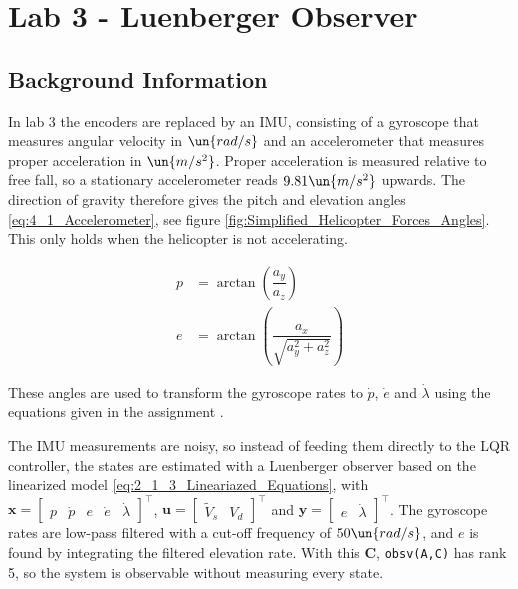 \section{Lab 3 - Luenberger Observer}

\subsection{Background Information}

In lab 3 the encoders are replaced by an IMU, consisting of a gyroscope that measures angular velocity in \(\un{rad/s}\) and an accelerometer that measures proper acceleration in \(\un{m/s^{2}}\).
Proper acceleration is measured relative to free fall, so a stationary accelerometer reads \(9.81\un{m/s^2}\) upwards.
The direction of gravity therefore gives the pitch and elevation angles \eqref{eq:4_1_Accelerometer}, see figure \ref{fig:Simplified_Helicopter_Forces_Angles}.
This only holds when the helicopter is not accelerating.

\begin{subequations}
    \begin{align}
        p & =\arctan\left( \dfrac{a_{y}}{a_{z}} \right) \label{eq:4_1_Pitch_From_Accelerometer} \\
        e & =\arctan\left( \dfrac{a_{x}}{\sqrt{ a_{y}^{2}+a_{z}^{2} }} \right) \label{eq:4_1_Elecvation_From_Accelerometer}
    \end{align} \label{eq:4_1_Accelerometer}
\end{subequations}

These angles are used to transform the gyroscope rates to \(\dot{p}\), \(\dot{e}\) and \(\dot{\lambda}\) using the equations given in the assignment \cite{helicopter_lab_assignment_2026}.

The IMU measurements are noisy, so instead of feeding them directly to the LQR controller, the states are estimated with a Luenberger observer \cite{chen_linear_system} based on the linearized model \eqref{eq:2_1_3_Lineariazed_Equations}, with
\(\mathbf{x}=\begin{bmatrix} p & \dot{p} & e & \dot{e} & \dot{\lambda} \end{bmatrix}^{\top}\),
\(\mathbf{u}=\begin{bmatrix} \tilde{V}_{s} & V_{d} \end{bmatrix}^{\top}\) and
\(\mathbf{y}=\begin{bmatrix} e & \dot{\lambda} \end{bmatrix}^{\top}\).
The gyroscope rates are low-pass filtered with a cut-off frequency of \(50\un{rad/s}\), and \(e\) is found by integrating the filtered elevation rate.
With this \(\mathbf{C}\), \verb|obsv(A,C)| has rank 5, so the system is observable without measuring every state.

